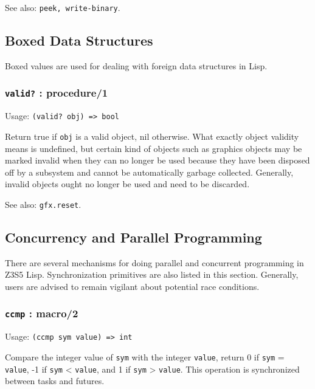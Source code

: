 \documentclass[
]{article}
\newcommand{\passthrough}[1]{#1}
\begin{document}
See also: \passthrough{\lstinline!peek, write-binary!}.

\hypertarget{boxed-data-structures}{%
\subsection{Boxed Data Structures}\label{boxed-data-structures}}

Boxed values are used for dealing with foreign data structures in Lisp.

\hypertarget{valid-procedure1}{%
\subsubsection{\texorpdfstring{\texttt{valid?} :
procedure/1}{valid? : procedure/1}}\label{valid-procedure1}}

Usage: \passthrough{\lstinline!(valid? obj) => bool!}

Return true if \passthrough{\lstinline!obj!} is a valid object, nil
otherwise. What exactly object validity means is undefined, but certain
kind of objects such as graphics objects may be marked invalid when they
can no longer be used because they have been disposed off by a subsystem
and cannot be automatically garbage collected. Generally, invalid
objects ought no longer be used and need to be discarded.

See also: \passthrough{\lstinline!gfx.reset!}.

\hypertarget{concurrency-and-parallel-programming}{%
\subsection{Concurrency and Parallel
Programming}\label{concurrency-and-parallel-programming}}

There are several mechanisms for doing parallel and concurrent
programming in Z3S5 Lisp. Synchronization primitives are also listed in
this section. Generally, users are advised to remain vigilant about
potential race conditions.

\hypertarget{ccmp-macro2}{%
\subsubsection{\texorpdfstring{\texttt{ccmp} :
macro/2}{ccmp : macro/2}}\label{ccmp-macro2}}

Usage: \passthrough{\lstinline!(ccmp sym value) => int!}

Compare the integer value of \passthrough{\lstinline!sym!} with the
integer \passthrough{\lstinline!value!}, return 0 if
\passthrough{\lstinline!sym!} = \passthrough{\lstinline!value!}, -1 if
\passthrough{\lstinline!sym!} \textless{}
\passthrough{\lstinline!value!}, and 1 if \passthrough{\lstinline!sym!}
\textgreater{} \passthrough{\lstinline!value!}. This operation is
synchronized between tasks and futures.
\end{document}
